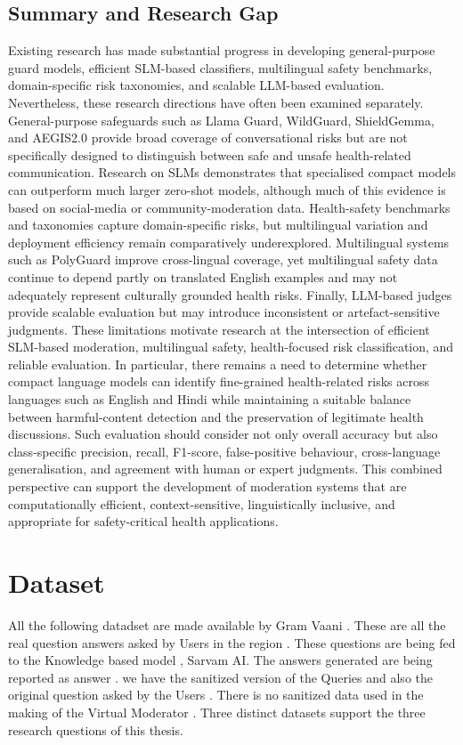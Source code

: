 \documentclass[11pt,a4paper]{article}
\begin{document}
\subsection{Summary and Research Gap}
Existing research has made substantial progress in developing general-purpose guard models, efficient SLM-based classifiers, multilingual safety benchmarks, domain-specific risk taxonomies, and scalable LLM-based evaluation. Nevertheless, these research directions have often been examined separately.
General-purpose safeguards such as Llama Guard, WildGuard, ShieldGemma, and AEGIS2.0 provide broad coverage of conversational risks but are not specifically designed to distinguish between safe and unsafe health-related communication. Research on SLMs demonstrates that specialised compact models can outperform much larger zero-shot models, although much of this evidence is based on social-media or community-moderation data. Health-safety benchmarks and taxonomies capture domain-specific risks, but multilingual variation and deployment efficiency remain comparatively underexplored. Multilingual systems such as PolyGuard improve cross-lingual coverage, yet multilingual safety data continue to depend partly on translated English examples and may not adequately represent culturally grounded health risks. Finally, LLM-based judges provide scalable evaluation but may introduce inconsistent or artefact-sensitive judgments.
These limitations motivate research at the intersection of efficient SLM-based moderation, multilingual safety, health-focused risk classification, and reliable evaluation. In particular, there remains a need to determine whether compact language models can identify fine-grained health-related risks across languages such as English and Hindi while maintaining a suitable balance between harmful-content detection and the preservation of legitimate health discussions. Such evaluation should consider not only overall accuracy but also class-specific precision, recall, F1-score, false-positive behaviour, cross-language generalisation, and agreement with human or expert judgments. This combined perspective can support the development of moderation systems that are computationally efficient, context-sensitive, linguistically inclusive, and appropriate for safety-critical health applications.


\section{Dataset}
\label{sec:dataset}
All the following datadset are made available by Gram Vaani . These are all the real question answers asked by Users in the region . These questions are being fed to the Knowledge based model , Sarvam AI. The answers  generated are being reported as answer . we have the sanitized version of the Queries and also the original question asked by the Users . There is no sanitized data used in the making of the Virtual Moderator .  
Three distinct datasets support the three research questions of this thesis.
\end{document}
